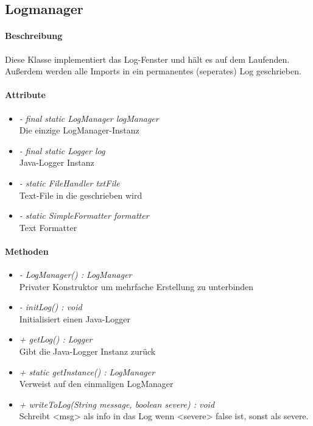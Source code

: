 \subsection{Logmanager}

\paragraph{Beschreibung}
Diese Klasse implementiert das Log-Fenster und hält es auf dem Laufenden.
Außerdem werden alle Imports in ein permanentes (seperates) Log geschrieben.


\paragraph{Attribute}

\begin{itemize}
	
\item \textit{- final static LogManager logManager}  
\\ Die einzige LogManager-Instanz 
\item \textit{- final static Logger log}
\\ Java-Logger Instanz
\item \textit{- static FileHandler txtFile}
\\ Text-File in die geschrieben wird
\item \textit{- static SimpleFormatter formatter}
\\ Text Formatter

\end{itemize}

\paragraph{Methoden}

\begin{itemize}
	
\item \textit{ - LogManager() : LogManager}  \\ Privater Konstruktor um mehrfache Erstellung zu unterbinden
\item \textit{ - initLog() : void} \\ Initialisiert einen Java-Logger
\item \textit{ + getLog() : Logger} \\ Gibt die Java-Logger Instanz zurück
\item \textit{ + static getInstance() : LogManager}  \\ Verweist auf den einmaligen LogManager
\item \textit{ + writeToLog(String message, boolean severe) : void} \\ Schreibt <msg> als info in das Log wenn <severe> false ist,
sonst als severe.
	
\end{itemize}